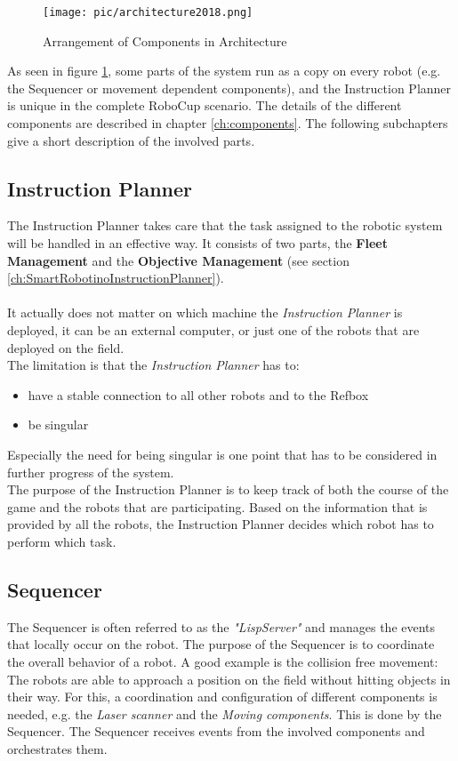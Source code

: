 \begin{figure}[h]
\centering
\texttt{[image: pic/architecture2018.png]}
\caption{Arrangement of Components in Architecture}
\label{fig:architecture_overview}
\end{figure}

As seen in figure \ref{fig:architecture_overview}, some parts of the system run as a copy on every robot (e.g. the Sequencer or movement dependent components), and the Instruction Planner is unique in the complete RoboCup scenario. The details of the different components are described in chapter \ref{ch:components}. The following subchapters give a short description of the involved parts.

\subsection{Instruction Planner}
The Instruction Planner takes care that the task assigned to the robotic system will be handled in an effective way. It consists of two parts, the \textbf{Fleet Management} and the \textbf{Objective Management} (see section \ref{ch:SmartRobotinoInstructionPlanner}). \\
\\
It actually does not matter on which machine the \textit{Instruction Planner} is deployed, it can be an external computer, or just one of the robots that are deployed on the field.\\
The limitation is that the \textit{Instruction Planner} has to:
\begin{itemize}
    \item have a stable connection to all other robots and to the Refbox
    \item be singular
\end{itemize}
Especially the need for being singular is one point that has to be considered in further progress of the system.
\\
The purpose of the Instruction Planner is to keep track of both the course of the game and the robots that are participating.
Based on the information that is provided by all the robots, the Instruction Planner decides which robot has to perform which task.

\subsection{Sequencer}
The Sequencer is often referred to as the \textit{"LispServer"} and manages the events that locally occur on the robot. The purpose of the Sequencer is to coordinate the overall behavior 
of a robot. 
A good example is the collision free movement: The robots are able to approach a position on the field without hitting objects in their way. For this, a coordination and configuration of different components is needed, 
e.g. the \textit{Laser scanner} and the \textit{Moving components}. This is done by the Sequencer. The Sequencer receives events from the involved components and orchestrates them.

